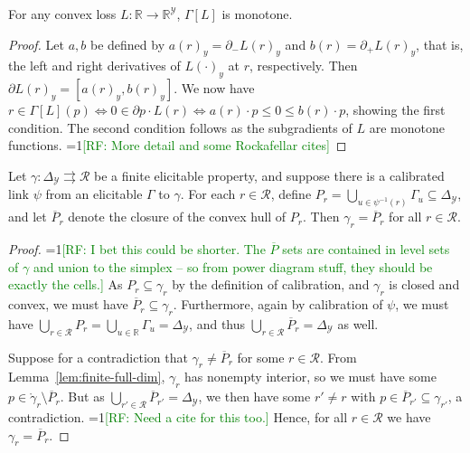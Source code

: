 \documentclass[anon,12pt]{colt2019}
\newcommand{\Comments}{1}
\newcommand{\mynote}[2]{\ifnum\Comments=1\textcolor{#1}{#2}\fi}
\newcommand{\raf}[1]{\mynote{green}{[RF: #1]}}
\newcommand{\reals}{\mathbb{R}}
\newcommand{\prop}[1]{\Gamma[#1]}
\newcommand{\simplex}{\Delta_\Y}
\newcommand{\R}{\mathcal{R}}
\newcommand{\Y}{\mathcal{Y}}
\newcommand{\inter}[1]{\mathring{#1}}%
\newcommand{\toto}{\rightrightarrows}
\begin{document}
\begin{lemma}\label{lem:prop-L-monotone}
  For any convex loss $L : \reals \to \reals^\Y$, $\prop{L}$ is monotone.
\end{lemma}
\begin{proof}
  Let $a,b$ be defined by $a(r)_y = \partial_- L(r)_y$ and $b(r) = \partial_+ L(r)_y$, that is, the left and right derivatives of $L(\cdot)_y$ at $r$, respectively.
  Then $\partial L(r)_y = [a(r)_y,b(r)_y]$.
  We now have $r \in \prop{L}(p) \iff 0 \in \partial p\cdot L(r) \iff a(r)\cdot p \leq 0 \leq b(r) \cdot p$, showing the first condition.
  The second condition follows as the subgradients of $L$ are monotone functions.
  \raf{More detail and some Rockafellar cites}
\end{proof}

\newcommand{\Pbar}{\overline P}
\begin{lemma}\label{lem:pbar}
  Let $\gamma:\simplex\toto\R$ be a finite elicitable property, and suppose there is a calibrated link $\psi$ from an elicitable $\Gamma$ to $\gamma$.
  For each $r\in\R$, define $P_r = \bigcup_{u\in\psi^{-1}(r)} \Gamma_u \subseteq \simplex$, and let $\Pbar_r$ denote the closure of the convex hull of $P_r$.
  Then $\gamma_r = \Pbar_r$ for all $r\in\R$.
\end{lemma}
\begin{proof}
  \raf{I bet this could be shorter.  The $\Pbar$ sets are contained in level sets of $\gamma$ and union to the simplex -- so from power diagram stuff, they should be exactly the cells.}
  As $P_r \subseteq \gamma_r$ by the definition of calibration, and $\gamma_r$ is closed and convex, we must have $\Pbar_r \subseteq \gamma_r$.
  Furthermore, again by calibration of $\psi$, we must have $\bigcup_{r\in\R} P_r = \bigcup_{u\in\reals} \Gamma_u = \simplex$, and thus $\bigcup_{r\in\R} \Pbar_r = \simplex$ as well.

  Suppose for a contradiction that $\gamma_r \neq \Pbar_r$ for some $r\in\R$.
  From Lemma~\ref{lem:finite-full-dim}, $\gamma_r$ has nonempty interior, so we must have some $p\in\inter\gamma_r \setminus \Pbar_r$.
  But as $\bigcup_{r'\in\R} \Pbar_{r'} = \simplex$, we then have some $r'\neq r$ with $p\in\Pbar_{r'} \subseteq \gamma_{r'}$, a contradiction.
  \raf{Need a cite for this too.}
  Hence, for all $r\in\R$ we have $\gamma_r = \Pbar_r$.
\end{proof}
\end{document}
